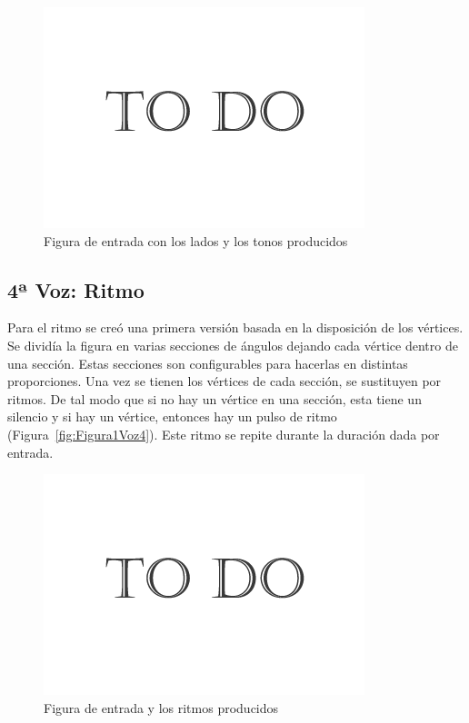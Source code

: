 		\begin{figure}[htbp]
		\centering
		\hspace*{0.0in}
		\includegraphics[scale=0.57]{graphics/todo.png}
		\caption{Figura de entrada con los lados y los tonos producidos}
		\label{fig:Figura2Voz3}
		\end{figure}


\subsection{4ª Voz: Ritmo}

Para el ritmo se creó una primera versión basada en la disposición de los vértices. Se dividía la figura en varias secciones de ángulos dejando cada vértice dentro de una sección. Estas secciones son configurables para hacerlas en distintas proporciones. Una vez se tienen los vértices de cada sección, se sustituyen por ritmos. De tal modo que si no hay un vértice en una sección, esta tiene un silencio y si hay un vértice, entonces hay un pulso de ritmo (Figura~\ref{fig:Figura1Voz4}). Este ritmo se repite durante la duración dada por entrada.

		\begin{figure}[htbp]
		\centering
		\hspace*{0.0in}
		\includegraphics[scale=0.57]{graphics/todo.png}
		\caption{Figura de entrada y los ritmos producidos}
		\label{fig:Figur1Voz4}
		\end{figure}

